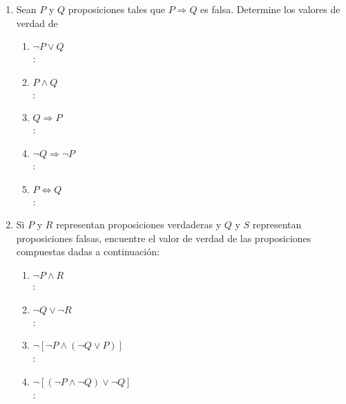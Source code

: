 \begin{enumerate}[label=0.1.\arabic*]
	\item Sean $ P $ y $ Q $ proposiciones tales que $ P \Rightarrow Q $ es falsa. Determine los valores de verdad de
	\begin{enumerate}[label=\arabic*)]
		\item $ \neg P \vee Q $ \\
		\solucion: \\
		
		\item $ P \wedge Q $ \\
		\solucion: \\
		
		\item $ Q \Rightarrow P $ \\
		\solucion: \\
		
		\item $ \neg Q \Rightarrow \neg P $ \\
		\solucion: \\
		
		\item $ P \Leftrightarrow Q $ \\
		\solucion: \\
		
	\end{enumerate}

	\item Si $ P $ y $ R $ representan proposiciones verdaderas y $ Q $ y $ S $ representan proposiciones falsas, encuentre el valor de verdad de las proposiciones compuestas dadas a continuación:
	\begin{enumerate}[label=\arabic*)]
		\item $ \neg P \wedge R $ \\
		\solucion: \\
		
		\item $ \neg Q \vee \neg R $ \\
		\solucion: \\
		
		\item $ \neg [ \neg P \wedge (\neg Q \vee P) ] $ \\
		\solucion: \\
		
		\item $ \neg [ ( \neg P \wedge \neg Q ) \vee \neg Q ] $ \\
		\solucion: \\
		

\end{enumerate}
\end{enumerate}
